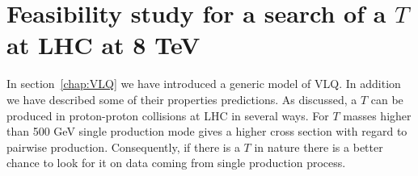 %
%
%
%
%
%

\chapter{Feasibility study for a search of a $T$ at LHC at 8 TeV}
\label{chap:pheno}

In section~\ref{chap:VLQ} we have introduced a generic model of VLQ. In addition we have described some of their properties predictions. As discussed, a $T$ can be produced in proton-proton collisions at LHC in several ways. For $T$ masses higher than 500 GeV single production mode gives a higher cross section with regard to pairwise production. Consequently, if there is a $T$ in nature there is a better chance to look for it on data coming from single production process. 

